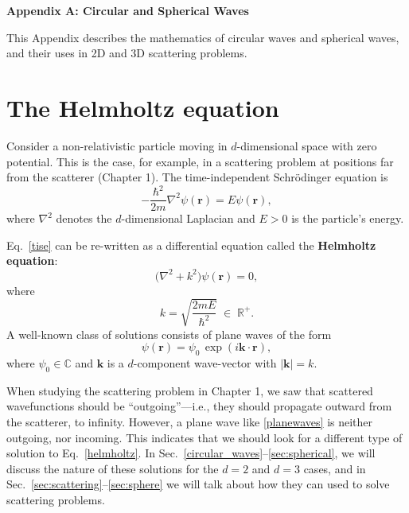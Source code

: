 \documentclass[prx,12pt]{revtex4-2}
\begin{document}
\begin{center}
{\large \textbf{Appendix A: Circular and Spherical Waves}}
\end{center}

This Appendix describes the mathematics of circular waves and
spherical waves, and their uses in 2D and 3D scattering problems.

\section{The Helmholtz equation}
\label{sec:helmholtz}

Consider a non-relativistic particle moving in $d$-dimensional space
with zero potential.  This is the case, for example, in a scattering
problem at positions far from the scatterer (Chapter 1).  The
time-independent Schr\"odinger equation is
\begin{equation}
  -\frac{\hbar^2}{2m}\nabla^2 \psi(\mathbf{r}) = E \psi(\mathbf{r}),
  \label{tise}
\end{equation}
where $\nabla^2$ denotes the $d$-dimensional Laplacian and $E > 0$ is
the particle's energy.

Eq.~\eqref{tise} can be re-written as a differential equation called
the \textbf{Helmholtz equation}:
\begin{equation}
  \Big(\nabla^2 + k^2\Big) \psi(\mathbf{r}) = 0,
  \label{helmholtz}
\end{equation}
where
\begin{equation}
  k = \sqrt{\frac{2mE}{\hbar^2}} \;\in\; \mathbb{R}^+.
  \label{kparm}
\end{equation}
A well-known class of solutions consists of plane waves of the form
\begin{equation}
  \psi(\mathbf{r}) = \psi_0 \, \exp\left(i\mathbf{k}\cdot\mathbf{r}\right),
  \label{planewaves}
\end{equation}
where $\psi_0 \in \mathbb{C}$ and $\mathbf{k}$ is a $d$-component
wave-vector with $|\mathbf{k}| = k$.

When studying the scattering problem in Chapter 1, we saw that
scattered wavefunctions should be ``outgoing''---i.e., they should
propagate outward from the scatterer, to infinity.  However, a plane
wave like \eqref{planewaves} is neither outgoing, nor incoming.  This
indicates that we should look for a different type of solution to
Eq.~\eqref{helmholtz}.  In
Sec.~\ref{circular_waves}--\ref{sec:spherical}, we will discuss the
nature of these solutions for the $d=2$ and $d=3$ cases, and in
Sec.~\ref{sec:scattering}--\ref{sec:sphere} we will talk about how
they can used to solve scattering problems.
\end{document}
